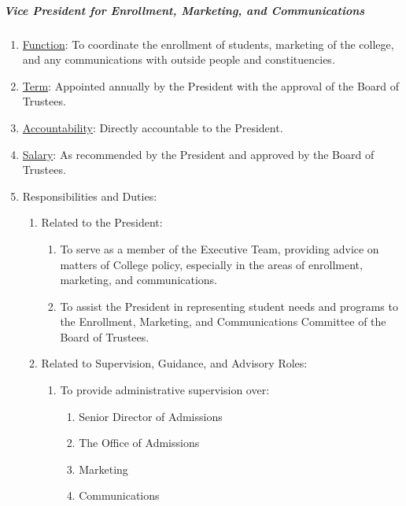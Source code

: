 				\subparagraph{Vice President for Enrollment, Marketing, and Communications}
					\begin{enumerate}
						\item{\underline{Function}: To coordinate the enrollment of students, marketing of the college, and any communications with outside people and constituencies.}
						\item{\underline{Term}: Appointed annually by the President with the approval of the Board of Trustees.}
						\item{\underline{Accountability}: Directly accountable to the President.}
						\item{\underline{Salary}: As recommended by the President and approved by the Board of Trustees.}
						\item{Responsibilities and Duties:
							\begin{enumerate}
								\item{Related to the President:
									\begin{enumerate}
										\item{To serve as a member of the Executive Team, providing advice on matters of College policy, especially in the areas of enrollment, marketing, and communications.}
										\item{To assist the President in representing student needs and programs to the Enrollment, Marketing, and Communications Committee of the Board of Trustees.}
									\end{enumerate}
								}
								\item{Related to Supervision, Guidance, and Advisory Roles:
									\begin{enumerate}
										\item{To provide administrative supervision over:
											\begin{enumerate}
												\item{Senior Director of Admissions}
												\item{The Office of Admissions}
												\item{Marketing}
												\item{Communications}
											\end{enumerate}
										}
									\end{enumerate}
								}
							\end{enumerate}
						}
					\end{enumerate}

